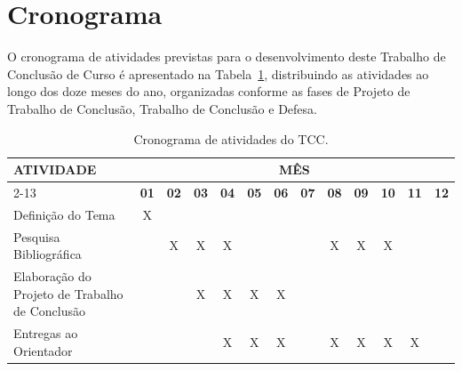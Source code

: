 \newpage %
\clearpage %

\section{Cronograma}

\par O cronograma de atividades previstas para o desenvolvimento deste Trabalho de Conclusão de Curso é apresentado na Tabela~\ref{tab:cronograma}, distribuindo as atividades ao longo dos doze meses do ano, organizadas conforme as fases de Projeto de Trabalho de Conclusão, Trabalho de Conclusão e Defesa.

\begin{table}[H]
    \centering
    \caption{Cronograma de atividades do TCC.}
    \label{tab:cronograma}
    \renewcommand{\arraystretch}{1.3}
    \begin{tabular}{|p{5.5cm}|c|c|c|c|c|c|c|c|c|c|c|c|}
        \hline
        \multirow{2}{*}{\textbf{ATIVIDADE}}              & \multicolumn{12}{c|}{\textbf{MÊS}}                                                                                                                                                           \\
        \cline{2-13}
                                                         & \textbf{01}                        & \textbf{02} & \textbf{03} & \textbf{04} & \textbf{05} & \textbf{06} & \textbf{07} & \textbf{08} & \textbf{09} & \textbf{10} & \textbf{11} & \textbf{12} \\
        \hline
        Definição do Tema                                & X                                  &             &             &             &             &             &             &             &             &             &             &             \\
        \hline
        Pesquisa Bibliográfica                           &                                    & X           & X           & X           &             &             &             & X           & X           & X           &             &             \\
        \hline
        Elaboração do Projeto de Trabalho de Conclusão   &                                    &             & X           & X           & X           & X           &             &             &             &             &             &             \\
        \hline
        Entregas ao Orientador                           &                                    &             &             & X           & X           & X           &             & X           & X           & X           & X           &             \\

\end{tabular}
\end{table}
